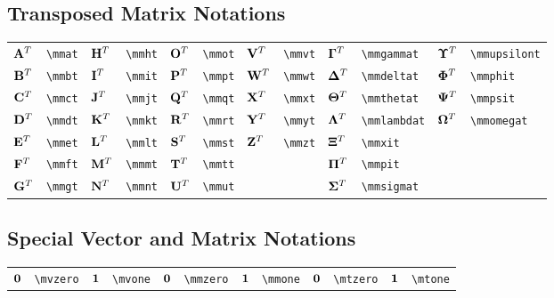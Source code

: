 \documentclass{article}
\begin{document}
\subsection{Transposed Matrix Notations}
\begin{tabular}{*{12}{l}}
${{\mathbf A}^T}$ & \lstinline`\mmat` & ${{\mathbf H}^T}$ & \lstinline`\mmht` & ${{\mathbf O}^T}$ & \lstinline`\mmot` & ${{\mathbf V}^T}$ & \lstinline`\mmvt` & ${{\bm \Gamma}^T}$ & \lstinline`\mmgammat` & ${{\bm \Upsilon}^T}$ & \lstinline`\mmupsilont`\\
${{\mathbf B}^T}$ & \lstinline`\mmbt` & ${{\mathbf I}^T}$ & \lstinline`\mmit` & ${{\mathbf P}^T}$ & \lstinline`\mmpt` & ${{\mathbf W}^T}$ & \lstinline`\mmwt` & ${{\bm \Delta}^T}$ & \lstinline`\mmdeltat` & ${{\bm \Phi}^T}$ & \lstinline`\mmphit`\\
${{\mathbf C}^T}$ & \lstinline`\mmct` & ${{\mathbf J}^T}$ & \lstinline`\mmjt` & ${{\mathbf Q}^T}$ & \lstinline`\mmqt` & ${{\mathbf X}^T}$ & \lstinline`\mmxt` & ${{\bm \Theta}^T}$ & \lstinline`\mmthetat` & ${{\bm \Psi}^T}$ & \lstinline`\mmpsit`\\
${{\mathbf D}^T}$ & \lstinline`\mmdt` & ${{\mathbf K}^T}$ & \lstinline`\mmkt` & ${{\mathbf R}^T}$ & \lstinline`\mmrt` & ${{\mathbf Y}^T}$ & \lstinline`\mmyt` & ${{\bm \Lambda}^T}$ & \lstinline`\mmlambdat` & ${{\bm \Omega}^T}$ & \lstinline`\mmomegat`\\
${{\mathbf E}^T}$ & \lstinline`\mmet` & ${{\mathbf L}^T}$ & \lstinline`\mmlt` & ${{\mathbf S}^T}$ & \lstinline`\mmst` & ${{\mathbf Z}^T}$ & \lstinline`\mmzt` & ${{\bm \Xi}^T}$ & \lstinline`\mmxit` & \\
${{\mathbf F}^T}$ & \lstinline`\mmft` & ${{\mathbf M}^T}$ & \lstinline`\mmmt` & ${{\mathbf T}^T}$ & \lstinline`\mmtt` &  &  & ${{\bm \Pi}^T}$ & \lstinline`\mmpit` & \\
${{\mathbf G}^T}$ & \lstinline`\mmgt` & ${{\mathbf N}^T}$ & \lstinline`\mmnt` & ${{\mathbf U}^T}$ & \lstinline`\mmut` &  &  & ${{\bm \Sigma}^T}$ & \lstinline`\mmsigmat` & \\
\end{tabular}


\subsection{Special Vector and Matrix Notations}
\begin{tabular}{*{12}{l}}
${\bm 0}$ & \lstinline`\mvzero` & ${\bm 1}$ & \lstinline`\mvone` & ${\mathbf 0}$ & \lstinline`\mmzero` & ${\mathbf 1}$ & \lstinline`\mmone` & ${\mathbf 0}$ & \lstinline`\mtzero` & ${\mathbf 1}$ & \lstinline`\mtone` \\
\end{tabular}
\end{document}

